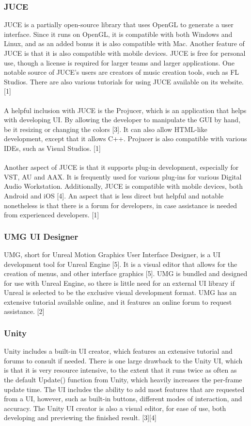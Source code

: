 \documentclass[onecolumn, draftclsnofoot,10pt, compsoc]{IEEEtran}
\begin{document}
\subsubsection{JUCE}
JUCE is a partially open-source library that uses OpenGL to generate a user interface. Since it runs on OpenGL, it is compatible with both Windows and Linux, and as an added bonus it is also compatible with Mac. Another feature of JUCE is that it is also compatible with mobile devices. JUCE is free for personal use, though a license is required for larger teams and larger applications. One notable source of JUCE's users are creators of music creation tools, such as FL Studios. There are also various tutorials for using JUCE available on its website. [1]
\\
\\
A helpful inclusion with JUCE is the Projucer, which is an application that helps with developing UI. By allowing the developer to manipulate the GUI by hand, be it resizing or changing the colors [3]. It can also allow HTML-like development, except that it allows C++. Projucer is also compatible with various IDEs, such as Visual Studios. [1]
\\
\\
Another aspect of JUCE is that it supports plug-in development, especially for VST, AU and AAX. It is frequently used for various plug-ins for various Digital Audio Workstation. Additionally, JUCE is compatible with mobile devices, both Android and iOS [4]. An aspect that is less direct but helpful and notable nonetheless is that there is a forum for developers, in case assistance is needed from experienced developers. [1]

\subsubsection{UMG UI Designer}
UMG, short for Unreal Motion Graphics User Interface Designer, is a UI development tool for Unreal Engine [5]. It is a visual editor that allows for the creation of menus, and other interface graphics [5]. UMG is bundled and designed for use with Unreal Engine, so there is little need for an external UI library if Unreal is selected to be the exclusive visual development format. UMG has an extensive tutorial available online, and it features an online forum to request assistance. [2]


\subsubsection{Unity}
Unity includes a built-in UI creator, which features an extensive tutorial and forums to consult if needed. There is one large drawback to the Unity UI, which is that it is very resource intensive, to the extent that it runs twice as often as the default Update() function from Unity, which heavily increases the per-frame update time. The UI  includes the ability to add most features that are requested from a UI, however, such as built-in buttons, different modes of interaction, and accuracy. The Unity UI creator is also a visual editor, for ease of use, both developing and previewing the finished result. [3][4]
\end{document}
